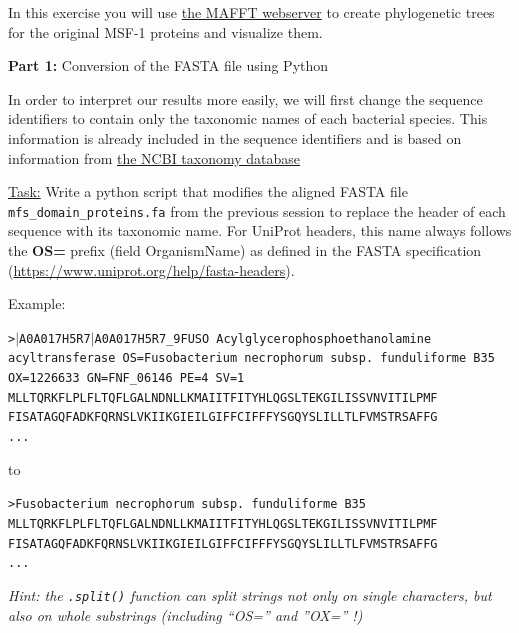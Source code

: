 \documentclass{article}
\begin{document}
\begin{question}[subtitle = UPGMA computation and visualization with MAFFT web server]
    In this exercise you will use \href{https://mafft.cbrc.jp/alignment/server/}{the MAFFT webserver} to create phylogenetic trees for the original MSF-1 proteins and visualize them.

    \textbf{Part 1:} Conversion of the FASTA file using Python

    In order to interpret our results more easily, we will first change the sequence identifiers to contain only the taxonomic names of each bacterial species. This information is already included in the sequence identifiers and is based on information from \href{https://www.ncbi.nlm.nih.gov/taxonomy}{the NCBI taxonomy database} 

    \underline{Task:} Write a python script that modifies the aligned FASTA file \texttt{mfs\_domain\_proteins.fa} from the previous session to replace the header of each sequence with its taxonomic name. For UniProt headers, this name always follows the \textbf{OS=} prefix (field OrganismName) as defined in the FASTA specification (\url{https://www.uniprot.org/help/fasta-headers}).

    Example:

    \begin{codeblock}
        \texttt{\textgreater$|$A0A017H5R7$|$A0A017H5R7\_9FUSO Acylglycerophosphoethanolamine acyltransferase OS=Fusobacterium necrophorum subsp. funduliforme B35 OX=1226633 GN=FNF\_06146 PE=4 SV=1}\\
        \texttt{MLLTQRKFLPLFLTQFLGALNDNLLKMAIITFITYHLQGSLTEKGILISSVNVITILPMF}\\
        \texttt{FISATAGQFADKFQRNSLVKIIKGIEILGIFFCIFFFYSGQYSLILLTLFVMSTRSAFFG} \\
        \texttt{...}
    \end{codeblock}

    to

    \begin{codeblock}
        \texttt{\textgreater Fusobacterium necrophorum subsp. funduliforme B35}\\
        \texttt{MLLTQRKFLPLFLTQFLGALNDNLLKMAIITFITYHLQGSLTEKGILISSVNVITILPMF}\\
        \texttt{FISATAGQFADKFQRNSLVKIIKGIEILGIFFCIFFFYSGQYSLILLTLFVMSTRSAFFG} \\
        \texttt{...}
    \end{codeblock}
    \small{\textit{Hint: the \texttt{.split()} function can split strings not only on single characters, but also on whole substrings (including “OS=” and ”OX=” !)}}
    \pagebreak
    

\end{question}
\end{document}
